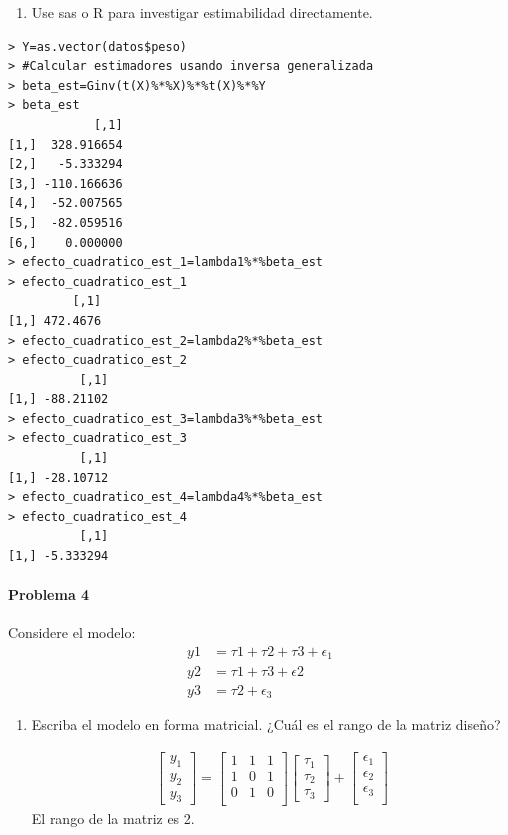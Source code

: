 \documentclass[10pt,a4paper]{report}
\begin{document}
\begin{enumerate}
\begin{enumerate}
\item Use sas o R para investigar estimabilidad directamente.\\

\end{enumerate}
\begin{verbatim}
> Y=as.vector(datos$peso)
> #Calcular estimadores usando inversa generalizada
> beta_est=Ginv(t(X)%*%X)%*%t(X)%*%Y
> beta_est
            [,1]
[1,]  328.916654
[2,]   -5.333294
[3,] -110.166636
[4,]  -52.007565
[5,]  -82.059516
[6,]    0.000000
> efecto_cuadratico_est_1=lambda1%*%beta_est
> efecto_cuadratico_est_1
         [,1]
[1,] 472.4676
> efecto_cuadratico_est_2=lambda2%*%beta_est
> efecto_cuadratico_est_2
          [,1]
[1,] -88.21102
> efecto_cuadratico_est_3=lambda3%*%beta_est
> efecto_cuadratico_est_3
          [,1]
[1,] -28.10712
> efecto_cuadratico_est_4=lambda4%*%beta_est
> efecto_cuadratico_est_4
          [,1]
[1,] -5.333294
\end{verbatim}

\paragraph{Problema 4} Considere el modelo:
\begin{align*}
    {y}{1} &= {\tau}{1} + {\tau}{2} + {\tau}{3} + {\epsilon}_{1} \\
    {y}{2} &= {\tau}{1} + {\tau}{3} + {\epsilon}{2} \\
    {y}{3} &= {\tau}{2} + {\epsilon}_{3}
\end{align*}
\begin{enumerate}
\item Escriba el modelo en forma matricial. ¿Cuál es el rango de la matriz diseño?
 
\begin{align*}
    \begin{bmatrix}
     y_{1}\\ y_{2} \\ y_{3} 
   \end{bmatrix}
       = \begin{bmatrix}
        1 &1 &1\\
        1 &0 &1\\
        0 &1 &0\\
    \end{bmatrix}  \begin{bmatrix}
        \tau_{1} \\ \tau_{2} \\ \tau_{3} \end{bmatrix} + \begin{bmatrix}
   \epsilon_{1}\\  \epsilon_{2} \\  \epsilon_{3} \\    
    \end{bmatrix}
\end{align*}
El rango de la matriz es 2. \\



\end{enumerate}
\end{enumerate}
\end{document}
